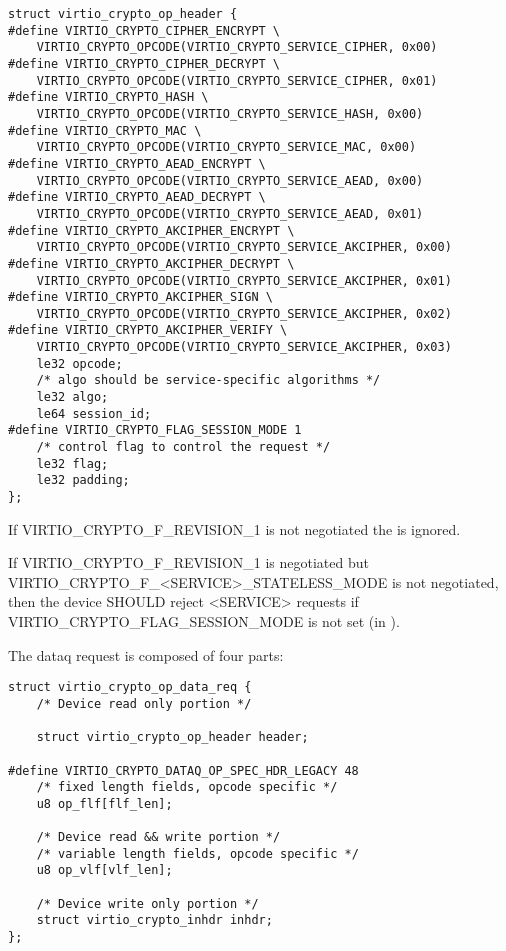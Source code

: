 \begin{lstlisting}
struct virtio_crypto_op_header {
#define VIRTIO_CRYPTO_CIPHER_ENCRYPT \
    VIRTIO_CRYPTO_OPCODE(VIRTIO_CRYPTO_SERVICE_CIPHER, 0x00)
#define VIRTIO_CRYPTO_CIPHER_DECRYPT \
    VIRTIO_CRYPTO_OPCODE(VIRTIO_CRYPTO_SERVICE_CIPHER, 0x01)
#define VIRTIO_CRYPTO_HASH \
    VIRTIO_CRYPTO_OPCODE(VIRTIO_CRYPTO_SERVICE_HASH, 0x00)
#define VIRTIO_CRYPTO_MAC \
    VIRTIO_CRYPTO_OPCODE(VIRTIO_CRYPTO_SERVICE_MAC, 0x00)
#define VIRTIO_CRYPTO_AEAD_ENCRYPT \
    VIRTIO_CRYPTO_OPCODE(VIRTIO_CRYPTO_SERVICE_AEAD, 0x00)
#define VIRTIO_CRYPTO_AEAD_DECRYPT \
    VIRTIO_CRYPTO_OPCODE(VIRTIO_CRYPTO_SERVICE_AEAD, 0x01)
#define VIRTIO_CRYPTO_AKCIPHER_ENCRYPT \
    VIRTIO_CRYPTO_OPCODE(VIRTIO_CRYPTO_SERVICE_AKCIPHER, 0x00)
#define VIRTIO_CRYPTO_AKCIPHER_DECRYPT \
    VIRTIO_CRYPTO_OPCODE(VIRTIO_CRYPTO_SERVICE_AKCIPHER, 0x01)
#define VIRTIO_CRYPTO_AKCIPHER_SIGN \
    VIRTIO_CRYPTO_OPCODE(VIRTIO_CRYPTO_SERVICE_AKCIPHER, 0x02)
#define VIRTIO_CRYPTO_AKCIPHER_VERIFY \
    VIRTIO_CRYPTO_OPCODE(VIRTIO_CRYPTO_SERVICE_AKCIPHER, 0x03)
    le32 opcode;
    /* algo should be service-specific algorithms */
    le32 algo;
    le64 session_id;
#define VIRTIO_CRYPTO_FLAG_SESSION_MODE 1
    /* control flag to control the request */
    le32 flag;
    le32 padding;
};
\end{lstlisting}

\begin{note}
If VIRTIO_CRYPTO_F_REVISION_1 is not negotiated the  is ignored.

If VIRTIO_CRYPTO_F_REVISION_1 is negotiated but VIRTIO_CRYPTO_F_<SERVICE>_STATELESS_MODE
is not negotiated, then the device SHOULD reject <SERVICE> requests if
VIRTIO_CRYPTO_FLAG_SESSION_MODE is not set (in ).
\end{note}

The dataq request is composed of four parts:
\begin{lstlisting}
struct virtio_crypto_op_data_req {
    /* Device read only portion */

    struct virtio_crypto_op_header header;

#define VIRTIO_CRYPTO_DATAQ_OP_SPEC_HDR_LEGACY 48
    /* fixed length fields, opcode specific */
    u8 op_flf[flf_len];

    /* Device read && write portion */
    /* variable length fields, opcode specific */
    u8 op_vlf[vlf_len];

    /* Device write only portion */
    struct virtio_crypto_inhdr inhdr;
};
\end{lstlisting}

